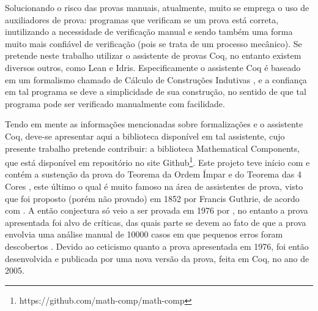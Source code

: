 Solucionando o risco das provas manuais, atualmente, muito se emprega o uso de auxiliadores de prova: programas que verificam se um prova está correta, inutilizando a necessidade de verificação manual e sendo também uma forma muito mais confiável de verificação (pois se trata de um processo mecânico). Se pretende neste trabalho utilizar o assistente de provas Coq, no entanto existem diversos outros, como Lean e Idris. Especificamente o assistente Coq é baseado em um formalismo chamado de Cálculo de Construções Indutivas \cite{paulinmohring:hal-01094195}, e a confiança em tal programa se deve a simplicidade de sua construção, no sentido de que tal programa pode ser verificado manualmente com facilidade.

Tendo em mente as informações mencionadas sobre formalizações e o assistente Coq, deve-se apresentar aqui a biblioteca disponível em tal assistente, cujo presente trabalho pretende contribuir: a biblioteca Mathematical Components, que está disponível em repositório no site Github\footnote{https://github.com/math-comp/math-comp}. Este projeto teve início com e contém a sustenção da prova do Teorema da Ordem Ímpar e do Teorema das 4 Cores \cite{assia_mahboubi_2022_7118596}, este último o qual é muito famoso na área de assistentes de prova, visto que foi proposto (porém não provado) em 1852 por Francis Guthrie, de acordo com \cite{gonthier:hal-04034866}. A então conjectura só veio a ser provada em 1976 por \cite{bams/1183538218}, no entanto a prova apresentada foi alvo de críticas, das quais parte se devem ao fato de que a prova envolvia uma análise manual de 10000 casos em que pequenos erros foram descobertos \cite{gonthier:hal-04034866}. Devido ao ceticismo quanto a prova apresentada em 1976, foi então desenvolvida e publicada por \cite{gonthier:hal-04034866} uma nova versão da prova, feita em Coq, no ano de 2005.

